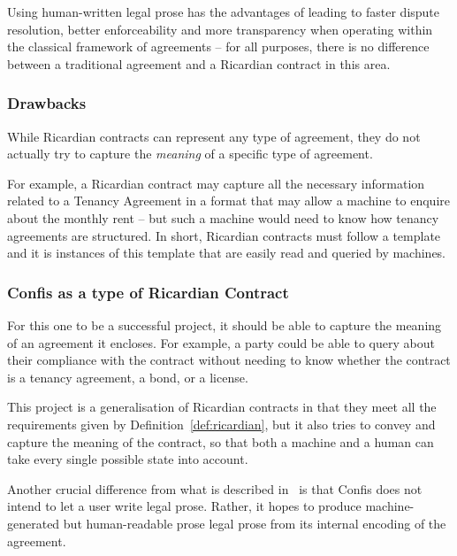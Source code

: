 Using human-written legal prose has the advantages of leading to faster dispute resolution, better enforceability and more transparency when operating within the classical framework of agreements -- for all purposes, there is no difference between a traditional agreement and a Ricardian contract in this area.\\

\subsubsection{Drawbacks}

While Ricardian contracts can represent any type of agreement, they do not actually try to capture the \emph{meaning} of a specific type of agreement.

For example, a Ricardian contract may capture all the necessary information related to a Tenancy Agreement in a format that may allow a machine to enquire about the monthly rent -- but such a machine would need to know how tenancy agreements are structured.
In short, Ricardian contracts must follow a template and it is instances of this template that are easily read and queried by machines.\\

\subsubsection{Confis as a type of Ricardian Contract}

For this one to be a successful project, it should be able to capture the meaning of an agreement it encloses.
For example, a party could be able to query about their compliance with the contract without needing to know whether the contract is a tenancy agreement, a bond, or a license.


This project is a generalisation of Ricardian contracts in that they meet all the requirements given by Definition~\ref{def:ricardian}, but it also tries to convey and capture the meaning of the contract, so that both a machine and a human can take every single possible state into account.

Another crucial difference from what is described in~\cite{grigg2004ricardian} is that Confis does not intend to let a user write legal prose.
Rather, it hopes to produce machine-generated but human-readable prose legal prose from its internal encoding of the agreement.
